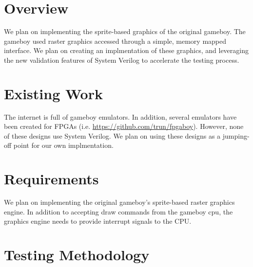 \documentclass{article}
\begin{document}
\newenvironment{frcseries}{\fontfamily{frc}\selectfont}{}
\newcommand{\textfrc}[1]{{\frcseries#1}}
\newcommand{\mathfrc}[1]{\text{\textfrc{#1}}}




\section{Overview}
We plan on implementing the sprite-based graphics of the original
gameboy. The gameboy used raster graphics accessed through a simple,
memory mapped interface. We plan on creating an implmentation of these
graphics, and leveraging the new validation features of System Verilog
to accelerate the testing process. 

\section{Existing Work}
The internet is full of gameboy emulators. In addition, several
emulators have been created for FPGAs (i.e.
\url{https://github.com/trun/fpgaboy}). However, none of these designs
use System Verilog. We plan on using these designs as a jumping-off
point for our own implmentation.

\section{Requirements}

We plan on implementing the original gameboy's sprite-based raster
graphics engine. In addition to accepting draw commands from the
gameboy cpu, the graphics engine needs to provide interrupt signals to
the CPU. 

\section{Testing Methodology}
\end{document}
